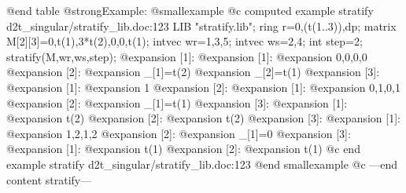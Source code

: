 @end table
@strong{Example:}
@smallexample
@c computed example stratify d2t_singular/stratify_lib.doc:123 
LIB "stratify.lib";
ring r=0,(t(1..3)),dp;
matrix M[2][3]=0,t(1),3*t(2),0,0,t(1);
intvec wr=1,3,5;
intvec ws=2,4;
int step=2;
stratify(M,wr,ws,step);
@expansion{} [1]:
@expansion{}    [1]:
@expansion{}       0,0,0,0
@expansion{}    [2]:
@expansion{}       _[1]=t(2)
@expansion{}       _[2]=t(1)
@expansion{}    [3]:
@expansion{}       [1]:
@expansion{}          1
@expansion{} [2]:
@expansion{}    [1]:
@expansion{}       0,1,0,1
@expansion{}    [2]:
@expansion{}       _[1]=t(1)
@expansion{}    [3]:
@expansion{}       [1]:
@expansion{}          t(2)
@expansion{}       [2]:
@expansion{}          t(2)
@expansion{} [3]:
@expansion{}    [1]:
@expansion{}       1,2,1,2
@expansion{}    [2]:
@expansion{}       _[1]=0
@expansion{}    [3]:
@expansion{}       [1]:
@expansion{}          t(1)
@expansion{}       [2]:
@expansion{}          t(1)
@c end example stratify d2t_singular/stratify_lib.doc:123
@end smallexample
@c ---end content stratify---
